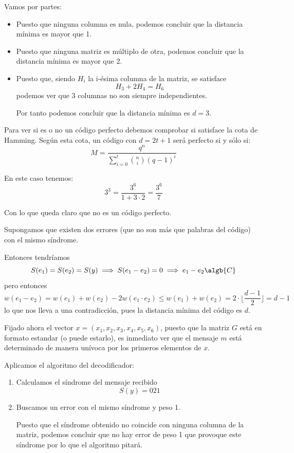 \begin{problem}[2]
\spart

Vamos por partes:

\begin{itemize}
\item Puesto que ninguna columna es nula, podemos concluir que la distancia mínima es mayor que 1.

\item Puesto que ninguna matriz es múltiplo de otra, podemos concluir que la distancia mínima es mayor que 2.

\item Puesto que, siendo $H_i$ la i-ésima columna de la matriz, se satisface
\[H_3+2H_4=H_6\]
podemos ver que 3 columnas no son siempre independientes.

Por tanto podemos concluir que la distancia mínima es $d=3$.
\end{itemize}

\spart

Para ver si es o no un código perfecto debemos comprobar si satisface la cota de Hamming. Según esta cota, un código con $d=2t+1$ será perfecto si y sólo si:
\[M=\frac{q^n}{\sum_{i=0}^t{n \choose i}(q-1)^i}\]

En este caso tenemos:
\[3^3=\frac{3^6}{1+3\cdot 2}=\frac{3^6}{7}\]

Con lo que queda claro que no es un código perfecto.

\spart

Supongamos que existen dos errores (que no son más que palabras del código) con el mismo síndrome.

Entonces tendríamos
\[S(e_1)=S(e_2)=S(y) \implies S(e_1-e_2)=0 \implies e_1-e_2 \algb{C}\]
pero entonces
\[w(e_1-e_2)=w(e_1)+w(e_2)-2w(e_1\cdot e_2) \leq w(e_1)+w(e_2) = 2\cdot \lfloor \frac{d-1}{2}\rfloor=d-1 \]
lo que nos lleva a una contradicción, pues la distancia mínima del código es $d$.

Fijado ahora el vector $x=(x_1,x_2,x_3,x_4,x_5,x_6)$, puesto que la matriz $G$ está en formato estandar (o puede estarlo), es inmediato ver que el mensaje $m$ está determinado de manera unívoca por los primeros elementos de $x$.

\spart

Aplicamos el algoritmo del decodificador:
\begin{enumerate}
\item Calculamos el síndrome del mensaje recibido
\[S(y)=021\]
\item
Buscamos un error con el mismo síndrome y peso 1.

Puesto que el síndrome obtenido no coincide con ninguna columna de la matriz, podemos concluir que no hay error de peso 1 que provoque este síndrome por lo que el algoritmo pitará.
\end{enumerate}

\end{problem}

